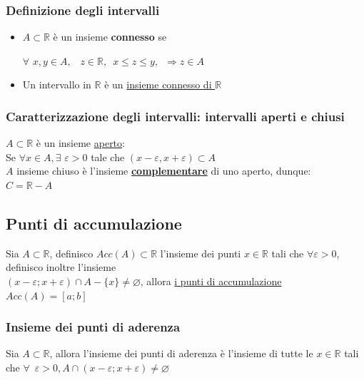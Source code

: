 \documentclass{article}
\theoremstyle{definition}
\newcommand{\R}{\mathbb{R}}
\begin{document}
\subsubsection{Definizione degli intervalli}
\begin{itemize}
    \item $A \subset \mathbb{R}$ è un insieme \textbf{connesso} se
    \begin{center}
        $\forall \,\, x,y \in A, \,\,\,\,\, z \in \mathbb{R}, \,\,\, x \leqslant z \leqslant y, \,\,\,\Longrightarrow  z \in A$
    \end{center}
    \item Un intervallo in $\R$ è un \underline{insieme connesso di $\mathbb{R}$}
\end{itemize}

\subsubsection{Caratterizzazione degli intervalli: intervalli aperti e chiusi}
$A \subset \mathbb{R}$ è un insieme \underline{aperto}:
\\
Se $\forall x \in A, \exists \,\, \varepsilon>0$ tale che $(x- \varepsilon, x+ \varepsilon) \subset A$
\\
$A$ insieme chiuso è l'insieme \textbf{\underline{complementare}} di uno aperto, dunque:
\\
$C=\mathbb{R}-A$

\subsection{Punti di accumulazione}
Sia $A \subset \mathbb{R}$, definisco $Acc(A) \subset \mathbb{R}$ l'insieme dei punti $x \in \mathbb{R}$ tali che $\forall \varepsilon > 0$, definisco inoltre l'insieme\\
$(x-\varepsilon; x+ \varepsilon) \cap A - \{x\} \neq \varnothing$, allora \underline{i punti di accumulazione $Acc(A)=[a;b]$}

\subsubsection{Insieme dei punti di aderenza}
Sia $A \subset \mathbb{R}$, allora l'insieme dei punti di aderenza è l'insieme di tutte le $x \in \mathbb{R}$ tali che $\forall \,\,\, \varepsilon > 0, A \cap (x- \varepsilon; x+ \varepsilon) \neq \varnothing$
\end{document}
